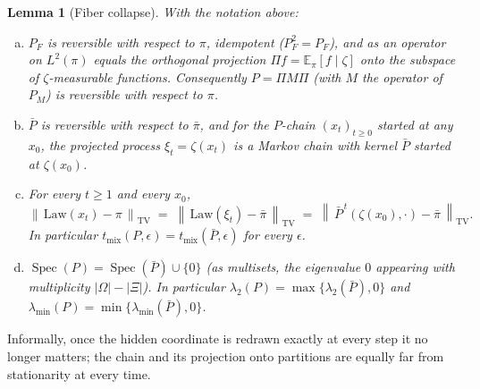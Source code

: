 \documentclass[11pt]{article}
\newcommand{\E}{\mathbb{E}}
\newcommand{\tv}[1]{\left\lVert #1 \right\rVert_{\mathrm{TV}}}
\newtheorem{lemma}[theorem]{Lemma}
\begin{document}
\begin{lemma}[Fiber collapse]
\label{lem:collapse}
With the notation above:
\begin{enumerate}[(a)]
  \item $P_F$ is reversible with respect to $\pi$, idempotent
    ($P_F^2 = P_F$), and as an operator on $L^2(\pi)$ equals the orthogonal
    projection $\Pi f = \E_\pi[f \mid \zeta]$ onto the subspace of
    $\zeta$-measurable functions. Consequently $P = \Pi M \Pi$ (with $M$
    the operator of $P_M$) is reversible with respect to $\pi$.
  \item $\bar P$ is reversible with respect to $\bar\pi$, and for the
    $P$-chain $(x_t)_{t \ge 0}$ started at any $x_0$, the projected process
    $\xi_t = \zeta(x_t)$ is a Markov chain with kernel $\bar P$ started at
    $\zeta(x_0)$.
  \item For every $t \ge 1$ and every $x_0$,
    \[
      \tv{\,\mathrm{Law}(x_t) - \pi\,}
        \;=\; \tv{\,\mathrm{Law}(\xi_t) - \bar\pi\,}
        \;=\; \tv{\,\bar P^{\,t}(\zeta(x_0), \cdot) - \bar\pi\,}.
    \]
    In particular $t_{\mathrm{mix}}(P, \epsilon) =
    t_{\mathrm{mix}}(\bar P, \epsilon)$ for every $\epsilon$.
  \item $\operatorname{Spec}(P) = \operatorname{Spec}(\bar P) \cup \{0\}$
    (as multisets, the eigenvalue $0$ appearing with multiplicity
    $|\Omega| - |\Xi|$). In particular
    $\lambda_2(P) = \max\{\lambda_2(\bar P), 0\}$ and
    $\lambda_{\min}(P) = \min\{\lambda_{\min}(\bar P), 0\}$.
\end{enumerate}
\end{lemma}

Informally, once the hidden coordinate is redrawn exactly at every
step it no longer matters; the chain and its projection onto partitions
are equally far from stationarity at every time.
\end{document}
